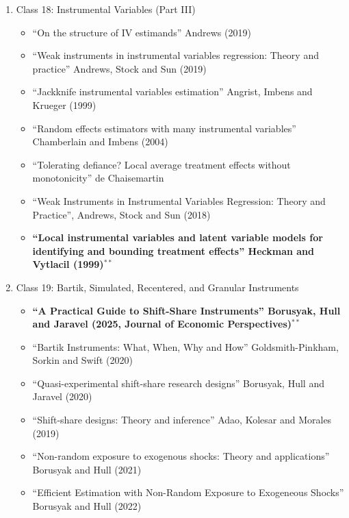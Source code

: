 \documentclass[11pt, a4paper]{article}
\begin{document}
\begin{enumerate}
\begin{enumerate}
\begin{itemize}
    \item ``Weak Instruments in Instrumental Variables Regression: Theory and Practice'', Andrews, Stock and Sun (2018)
    \item ``Local instrumental variables and latent variable models for identifying and bounding treatment effects'' Heckman and Vytlacil (1999)
    \end{itemize}
  \item Class 18: Instrumental Variables (Part III)
    \begin{itemize}
    \item ``On the structure of IV estimands'' Andrews (2019)
    \item ``Weak instruments in instrumental variables regression: Theory and practice'' Andrews, Stock and Sun (2019)
    \item ``Jackknife instrumental variables estimation'' Angrist, Imbens and Krueger (1999)
    \item ``Random effects estimators with many instrumental variables'' Chamberlain and Imbens (2004)
    \item ``Tolerating defiance? Local average treatment effects without monotonicity'' de Chaisemartin
    \item ``Weak Instruments in Instrumental Variables Regression: Theory and Practice'', Andrews, Stock and Sun (2018)
    \item \textbf{``Local instrumental variables and latent variable models for identifying and bounding treatment effects'' Heckman and  Vytlacil (1999)}$^{**}$
    \end{itemize}
  \item Class 19: Bartik, Simulated, Recentered, and Granular Instruments
    \begin{itemize}
    \item \textbf{``A Practical Guide to Shift-Share Instruments'' Borusyak, Hull and Jaravel (2025, Journal of Economic Perspectives)}$^{**}$
    \item ``Bartik Instruments: What, When, Why and How'' Goldsmith-Pinkham, Sorkin and Swift (2020)
    \item ``Quasi-experimental shift-share research designs'' Borusyak, Hull and Jaravel (2020)
    \item ``Shift-share designs: Theory and inference'' Adao, Kolesar and Morales (2019)
    \item ``Non-random exposure to exogenous shocks: Theory and applications'' Borusyak and Hull (2021)
    \item ``Efficient Estimation with Non-Random Exposure to Exogeneous Shocks'' Borusyak and Hull (2022)

\end{itemize}
\end{enumerate}
\end{enumerate}
\end{document}
